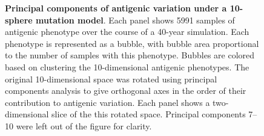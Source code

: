 \documentclass[11pt,oneside,letterpaper]{article}
\begin{document}
\vspace*{\fill}
\begin{figure}[H]
	\centering
	\caption{\textbf{Principal components of antigenic variation under a 10-sphere mutation model}. Each panel shows 5991 samples of antigenic phenotype over the course of a 40-year simulation.  Each phenotype is represented as a bubble, with bubble area proportional to the number of samples with this phenotype.  Bubbles are colored based on clustering the 10-dimensional antigenic phenotypes.  The original 10-dimensional space was rotated using principal components analysis to give orthogonal axes in the order of their contribution to antigenic variation.  Each panel shows a two-dimensional slice of the this rotated space.  Principal components 7--10 were left out of the figure for clarity.}
	\label{10dgrid}
\end{figure}
\vspace*{\fill}
\end{document}
